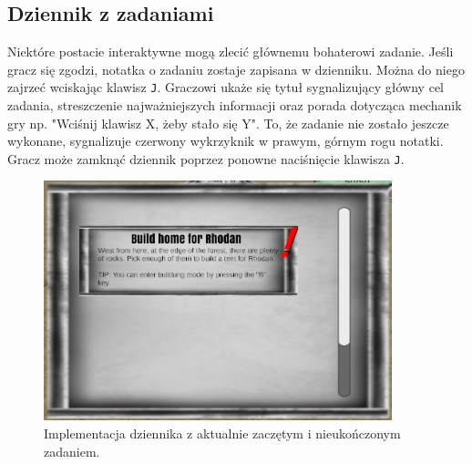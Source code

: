 \subsection{Dziennik z zadaniami}
Niektóre postacie interaktywne mogą zlecić głównemu bohaterowi zadanie. Jeśli gracz się zgodzi, notatka o zadaniu zostaje zapisana w dzienniku. Można do niego zajrzeć
wciskając klawisz \texttt{J}. Graczowi ukaże się tytuł sygnalizujący główny cel zadania, streszczenie najważniejszych informacji oraz porada dotycząca mechanik gry np.
"Wciśnij klawisz X, żeby stało się Y". To, że zadanie nie zostało jeszcze wykonane, sygnalizuje czerwony wykrzyknik w prawym, górnym rogu notatki. Gracz może 
zamknąć dziennik poprzez ponowne naciśnięcie klawisza \texttt{J}.
\begin{figure}[htbp]
    \centering
    \includegraphics[width=0.9\textwidth]{images/ui/journal_quest.png}
    \caption{Implementacja dziennika z aktualnie zaczętym i nieukończonym zadaniem.}\label{fig:end_sc}
\end{figure}
\FloatBarrier

